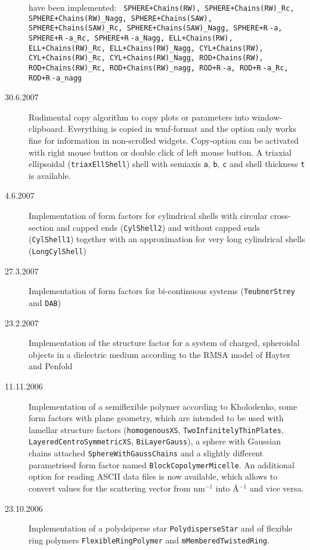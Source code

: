 \begin{description}
    have been implemented:
    \texttt{
    SPHERE+Chains(RW), SPHERE+Chains(RW)\_Rc, SPHERE+Chains(RW)\_Nagg,
    SPHERE+Chains(SAW), SPHERE+Chains(SAW)\_Rc, SPHERE+Chains(SAW)\_Nagg,
    SPHERE+R$\hat{~}$-a, SPHERE+R$\hat{~}$-a\_Rc, SPHERE+R$\hat{~}$-a\_Nagg,
    ELL+Chains(RW), ELL+Chains(RW)\_Rc, ELL+Chains(RW)\_Nagg,
    CYL+Chains(RW), CYL+Chains(RW)\_Rc, CYL+Chains(RW)\_Nagg,
    ROD+Chains(RW), ROD+Chains(RW)\_Rc, ROD+Chains(RW)\_nagg,
    ROD+R$\hat{~}$-a, ROD+R$\hat{~}$-a\_Rc, ROD+R$\hat{~}$-a\_nagg
    }
    \item[30.6.2007] Rudimental copy algorithm to copy plots or parameters into window-clipboard. Everything
    is copied in wmf-format and the option only works fine for information in non-scrolled widgets.
    Copy-option can be activated with right mouse button or double click of left mouse button.
    A triaxial ellipsoidal (\texttt{triaxEllShell}) shell with semiaxis \texttt{a}, \texttt{b}, \texttt{c}
    and shell thickness \texttt{t} is available.
    \item[4.6.2007] Implementation of form factors for cylindrical shells with circular cross-section and capped ends
    (\texttt{CylShell2}) and without capped ends (\texttt{CylShell1}) together with an approximation for very long
    cylindrical shells (\texttt{LongCylShell})
    \item[27.3.2007] Implementation of form factors for bi-continuous systems (\texttt{TeubnerStrey} and \texttt{DAB})
    \item[23.2.2007] Implementation of the structure factor for a system of charged, spheroidal objects in a
    dielectric medium according to the RMSA model of Hayter and Penfold
    \item[11.11.2006]  Implementation of a semiflexible polymer according to Kholodenko,
    some form factors with plane geometry, which are intended to be used with lamellar structure factors
    (\texttt{homogenousXS}, \texttt{TwoInfinitelyThinPlates},
     \texttt{LayeredCentroSymmetricXS}, \texttt{BiLayerGauss}), a sphere with Gaussian chains attached
    \texttt{SphereWithGaussChains} and a slightly different parametrised form factor named
    \texttt{BlockCopolymerMicelle}.
    An additional option for reading ASCII data files is now available,
    which allows to convert values for the scattering vector from
    nm$^{-1}$ into \AA$^{-1}$ and vice versa. \sloppy
    \item[23.10.2006] Implementation of a polydsiperse star \texttt{PolydisperseStar} and
    of flexible ring polymers \texttt{FlexibleRingPolymer} and \texttt{mMemberedTwistedRing}.

\end{description}
